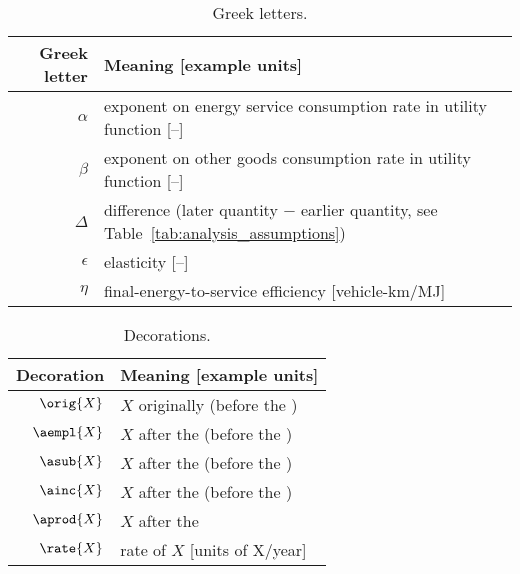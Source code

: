 
\begin{table}
\centering %
\caption{Greek letters.}
\begin{tabular}{r l}
  \toprule
  Greek letter & Meaning [example units] \\
  \midrule
  $\alpha$ & exponent on energy service consumption rate in utility function [--] \\
  $\beta$  & exponent on other goods consumption rate in utility function [--] \\
  $\Delta$ & difference (later quantity $-$ earlier quantity, see Table~\ref{tab:analysis_assumptions}) \\
  $\epsilon$ & elasticity [--] \\
  $\eta$ & final-energy-to-service efficiency [vehicle-km/MJ] \\
  \bottomrule
\end{tabular}
\label{tab:greek}
\end{table}



\begin{table}
\centering %
\caption{Decorations.}
\begin{tabular}{r l}
  \toprule
  Decoration & Meaning [example units] \\
  \midrule
  $\orig{X}$ & $X$ originally (before the \empleffect{}) \\
  $\aempl{X}$  & $X$ after the \empleffect{} (before the \subeffect{}) \\
  $\asub{X}$ & $X$ after the \subeffect{} (before the \inceffect{}) \\
  $\ainc{X}$ & $X$ after the \inceffect{} (before the \prodeffect{}) \\
  $\aprod{X}$ & $X$ after the \prodeffect{} \\
  $\rate{X}$ & rate of $X$ [units of X/year] \\
  \bottomrule
\end{tabular}
\label{tab:decorations}
\end{table}



